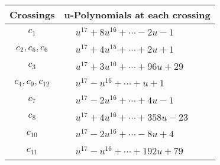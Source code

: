 \documentclass[1p]{elsarticle_modified}
\theoremstyle{definition}
\begin{document}
\begin{tabular}{m{50pt}|m{274pt}}
Crossings & \hspace{64pt}u-Polynomials at each crossing \\
\hline $$\begin{aligned}c_{1}\end{aligned}$$&$\begin{aligned}
&u^{17}+8 u^{16}+\cdots-2 u-1
\end{aligned}$\\
\hline $$\begin{aligned}c_{2},c_{5},c_{6}\end{aligned}$$&$\begin{aligned}
&u^{17}+4 u^{15}+\cdots+2 u+1
\end{aligned}$\\
\hline $$\begin{aligned}c_{3}\end{aligned}$$&$\begin{aligned}
&u^{17}+3 u^{16}+\cdots+96 u+29
\end{aligned}$\\
\hline $$\begin{aligned}c_{4},c_{9},c_{12}\end{aligned}$$&$\begin{aligned}
&u^{17}- u^{16}+\cdots+u+1
\end{aligned}$\\
\hline $$\begin{aligned}c_{7}\end{aligned}$$&$\begin{aligned}
&u^{17}-2 u^{16}+\cdots+4 u-1
\end{aligned}$\\
\hline $$\begin{aligned}c_{8}\end{aligned}$$&$\begin{aligned}
&u^{17}+4 u^{16}+\cdots+358 u-23
\end{aligned}$\\
\hline $$\begin{aligned}c_{10}\end{aligned}$$&$\begin{aligned}
&u^{17}-2 u^{16}+\cdots-8 u+4
\end{aligned}$\\
\hline $$\begin{aligned}c_{11}\end{aligned}$$&$\begin{aligned}
&u^{17}- u^{16}+\cdots+192 u+79
\end{aligned}$\\
\hline
\end{tabular}\\~\\
\end{document}
